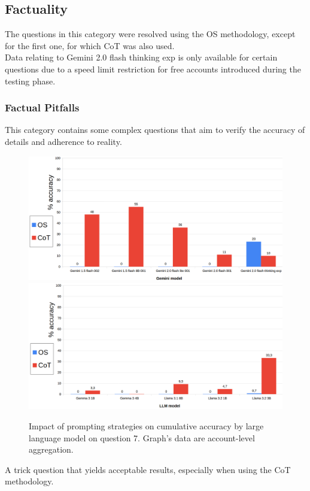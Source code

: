 \documentclass[12pt]{article}
\begin{document}
\vspace{2cm}
\subsection{Factuality}
The questions in this category were resolved using the OS methodology, except for the first one, for which CoT was also used.\\
Data relating to Gemini 2.0 flash thinking exp is only available for certain questions due to a speed limit restriction for free accounts introduced during the testing phase.\\
\subsubsection{Factual Pitfalls} %
This category contains some complex questions that aim to verify the accuracy of details and adherence to reality.\\


\begin{figure}[H]
    \centering
            \includegraphics[width=1\textwidth]{q201Gemini.png}
            \includegraphics[width=1\textwidth]{q201Other.png}
    \caption[Accuracy on Question 7 by LLM]{Impact of prompting strategies on cumulative accuracy by large language model on question 7. Graph's data are account-level aggregation.}
    \label{fig:32}
    \end{figure} 
A trick question that yields acceptable results, especially when using the CoT methodology.\\
\end{document}
